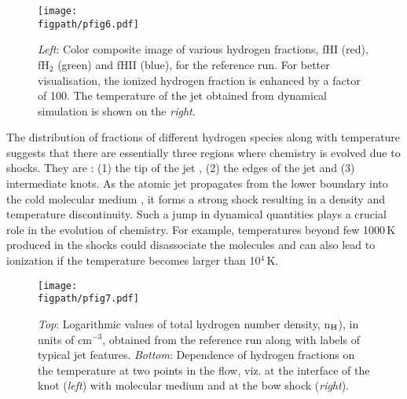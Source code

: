 \documentclass[useAMS,usenatbib]{mn2e}
\newcommand{\figpath}{../NEWFIGS}
\begin{document}
\begin{figure}
 \texttt{[image: \\figpath/pfig6.pdf]}%
 \caption{{\it{Left}}: Color composite image of various hydrogen
   fractions, fHI (red), fH$_{2}$ (green) and fHII (blue), for the
   reference run. For better visualisation, the ionized hydrogen
   fraction is enhanced by a factor of 100. The temperature of the jet
 obtained from dynamical simulation is shown on the {\it{right}}.}
\label{fig:Hfracsim}
\end{figure}


The distribution of fractions of different hydrogen species along with
temperature suggests that there are essentially three regions where
chemistry is evolved due to shocks.
They are : (1) the tip of the jet , (2) the edges of the jet and
(3) intermediate knots. 
As the atomic jet propagates from the lower boundary 
into the cold molecular medium , it forms a strong shock resulting in
a density and temperature discontinuity. Such a jump in
dynamical quantities plays a crucial role in the evolution of
chemistry. For example, temperatures beyond few 1000\,K produced in the shocks could
disassociate the molecules and can also lead to ionization if
the temperature becomes larger than 10$^{4}$\,K.

%

\begin{figure*}
 \texttt{[image: \\figpath/pfig7.pdf]}%
 \caption{{\it Top}: Logarithmic values of total hydrogen number density, n$_{\rm H}$),
   in units of cm$^{-3}$, obtained from the reference 
 run along with labels of typical jet features. {\it Bottom}: Dependence of hydrogen fractions on the temperature at two
  points in the flow, viz. at the interface of the knot ({\it left}) with molecular
 medium and at the bow shock ({\it right}).}
\label{fig:Hmolform}
\end{figure*}
\end{document}
